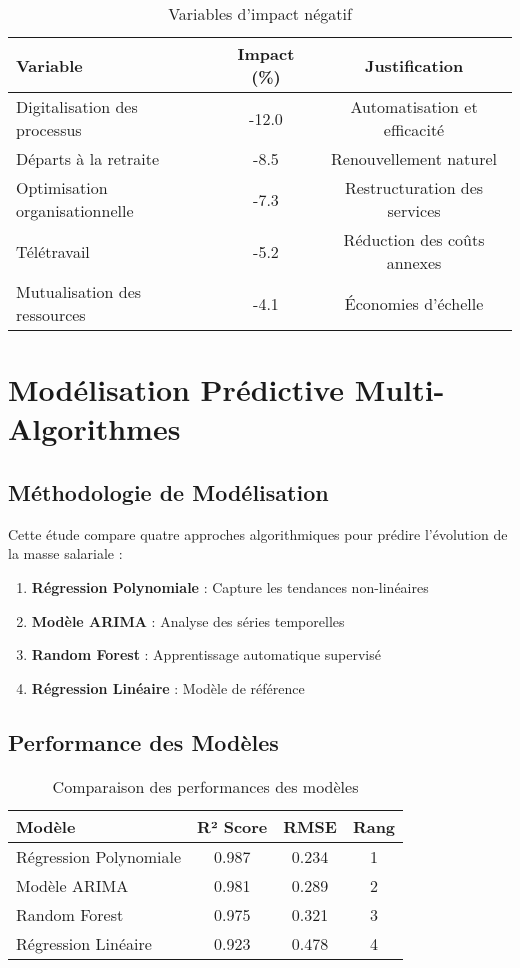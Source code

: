 \documentclass[12pt,a4paper]{article}
\begin{document}
\begin{table}[H]
\centering
\caption{Variables d'impact négatif}
\begin{tabular}{@{}lcc@{}}
\toprule
\textbf{Variable} & \textbf{Impact (\%)} & \textbf{Justification} \\
\midrule
Digitalisation des processus & -12.0 & Automatisation et efficacité \\
Départs à la retraite & -8.5 & Renouvellement naturel \\
Optimisation organisationnelle & -7.3 & Restructuration des services \\
Télétravail & -5.2 & Réduction des coûts annexes \\
Mutualisation des ressources & -4.1 & Économies d'échelle \\
\bottomrule
\end{tabular}
\end{table}

\newpage

\section{Modélisation Prédictive Multi-Algorithmes}

\subsection{Méthodologie de Modélisation}
Cette étude compare quatre approches algorithmiques pour prédire l'évolution de la masse salariale :

\begin{enumerate}
    \item \textbf{Régression Polynomiale} : Capture les tendances non-linéaires
    \item \textbf{Modèle ARIMA} : Analyse des séries temporelles
    \item \textbf{Random Forest} : Apprentissage automatique supervisé
    \item \textbf{Régression Linéaire} : Modèle de référence
\end{enumerate}

\subsection{Performance des Modèles}
\begin{table}[H]
\centering
\caption{Comparaison des performances des modèles}
\begin{tabular}{@{}lccc@{}}
\toprule
\textbf{Modèle} & \textbf{R² Score} & \textbf{RMSE} & \textbf{Rang} \\
\midrule
Régression Polynomiale & 0.987 & 0.234 & 1 \\
Modèle ARIMA & 0.981 & 0.289 & 2 \\
Random Forest & 0.975 & 0.321 & 3 \\
Régression Linéaire & 0.923 & 0.478 & 4 \\
\bottomrule
\end{tabular}
\end{table}
\end{document}
